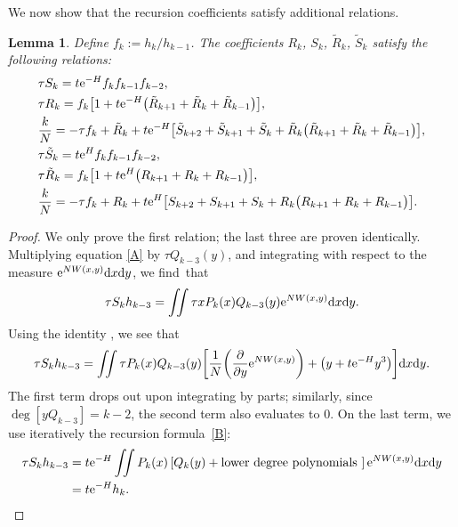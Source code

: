 \documentclass[pdftex]{sigma}
\numberwithin{equation}{section}
\newtheorem{Lemma}[Theorem]{Lemma}
\begin{document}
We now show that the recursion coefficients satisfy additional relations.
\begin{Lemma}
 Define $f_k := h_k/h_{k-1}$. The coefficients $R_k$, $S_k$, $\tilde{R}_k$, $\tilde{S}_k$ satisfy the following relations:
 \begin{align}
 &\tau S_k= t {\rm e}^{-H} f_k f_{k-1} f_{k-2},\label{S1}\\
 &\tau R_k= f_k\bigl[1 + t{\rm e}^{-H}\bigl(\tilde{R}_{k+1} + \tilde{R}_k + \tilde{R}_{k-1}\bigr)\bigr], \label{string1-A}\\
 &\frac{k}{N}= -\tau f_k + \tilde{R}_k + t{\rm e}^{-H}\bigl[\tilde{S}_{k+2} + \tilde{S}_{k+1} + \tilde{S}_{k} + \tilde{R}_k\bigl(\tilde{R}_{k+1} + \tilde{R}_{k} + \tilde{R}_{k-1}\bigr)\bigr],\\
 &\tau \tilde{S}_k= t {\rm e}^{H} f_k f_{k-1} f_{k-2},\\
 &\tau \tilde{R}_k= f_k\bigl[1 + t{\rm e}^{H}\bigl({R}_{k+1} + {R}_k + {R}_{k-1}\bigr)\bigr], \label{string1-B}\\
 &\frac{k}{N}= -\tau f_k + {R}_k + t{\rm e}^{H}\bigl[{S}_{k+2} + {S}_{k+1} + {S}_{k} + {R}_k\bigl({R}_{k+1} + {R}_{k} + {R}_{k-1}\bigr)\bigr]\label{f2}.
 \end{align}
\end{Lemma}
 \begin{proof}
 We only prove the first relation; the last three are proven identically. Multiplying equation \eqref{A} by $\tau Q_{k-3}(y)$, and integrating with respect to the measure ${\rm e}^{NW(x,y)}{\rm d}x{\rm d}y$, we find~that
 \begin{equation*}
 \tau S_k h_{k-3} = \iint \tau xP_k(x) Q_{k-3}(y) {\rm e}^{NW(x,y)}{\rm d}x{\rm d}y.
 \end{equation*}
 Using the identity , we see that
 \begin{equation*}
 \tau S_k h_{k-3} = \iint \tau P_k(x) Q_{k-3}(y) \biggl[\frac{1}{N}\biggl(\frac{\partial}{\partial y} {\rm e}^{NW(x,y)}\biggr) + \bigl(y + t{\rm e}^{-H}y^3\bigr)\biggr]{\rm d}x{\rm d}y.
 \end{equation*}
 The first term drops out upon integrating by parts; similarly, since $\deg [ y Q_{k-3}] = k-2$, the second term also evaluates to $0$. On the
 last term, we use iteratively the recursion formula~\eqref{B}:
 \begin{align*}
 \tau S_k h_{k-3} &{}= t {\rm e}^{-H} \iint P_k(x) \left[Q_k(y) + \text{lower degree polynomials }\right]{\rm e}^{NW(x,y)}{\rm d}x{\rm d}y \\
 &{}= t {\rm e}^{-H} h_k.
\tag*{\qed}
\end{align*}
\renewcommand{\qed}{}
\end{proof}
\end{document}
